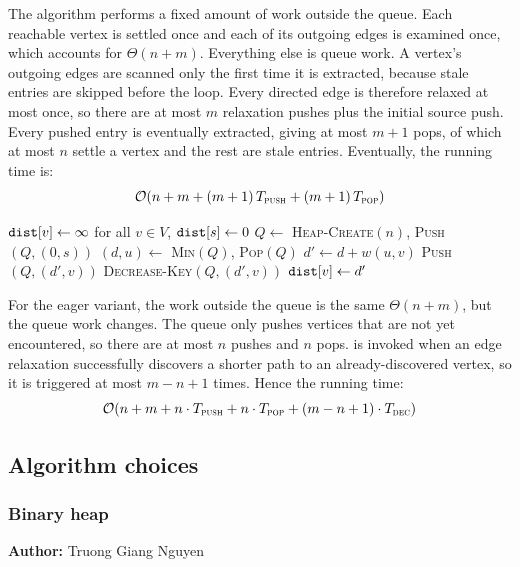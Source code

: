 The algorithm performs a fixed amount of work outside the queue. Each reachable vertex is settled once and each of its outgoing edges is examined once, which accounts for $\Theta(n + m)$. Everything else is queue work. A vertex's outgoing edges are scanned only the first time it is extracted, because stale entries are skipped before the loop. Every directed edge is therefore relaxed at most once, so there are at most $m$ relaxation pushes plus the initial source push. Every pushed entry is eventually extracted, giving at most $m + 1$ pops, of which at most $n$ settle a vertex and the rest are stale entries. Eventually, the running time is:
\[
  \mathcal{O}\!\left(n + m + (m + 1)\,T_{\textsc{push}} + (m + 1)\,T_{\textsc{pop}}\right)
\]

\begin{algorithm}[H]
\caption{Dijkstra's algorithm, eager update ()}
\begin{algorithmic}[1]
\STATE $\code{dist}[v] \leftarrow \infty$ for all $v \in V$, \quad $\code{dist}[s] \leftarrow 0$
\STATE $Q \leftarrow$ \textsc{Heap-Create}$(n)$, \quad \textsc{Push}$(Q, (0, s))$
  \STATE $(d, u) \leftarrow$ \textsc{Min}$(Q)$, \quad \textsc{Pop}$(Q)$
    \STATE $d' \leftarrow d + w(u,v)$
        \STATE \textsc{Push}$(Q, (d', v))$
      \ELSE
        \STATE \textsc{Decrease-Key}$(Q, (d', v))$
      \ENDIF
      \STATE $\code{dist}[v] \leftarrow d'$
    \ENDIF
  \ENDFOR
\ENDWHILE
\end{algorithmic}
\end{algorithm}

For the eager variant, the work outside the queue is the same $\Theta(n + m)$, but the queue work changes. The queue only pushes vertices that are not yet encountered, so there are at most $n$ pushes and $n$ pops.  is invoked when an edge relaxation successfully discovers a shorter path to an already-discovered vertex, so it is triggered at most $m - n + 1$ times. Hence the running time:
\[
  \mathcal{O}\!\left(n + m + n \cdot T_{\textsc{push}} + n \cdot T_{\textsc{pop}}
    + (m - n + 1) \cdot T_{\textsc{dec}}\right)
\]

\subsection{Algorithm choices}

\subsubsection{Binary heap}
\vspace{-0.2cm}
{\small \textbf{Author:} Truong Giang Nguyen}

